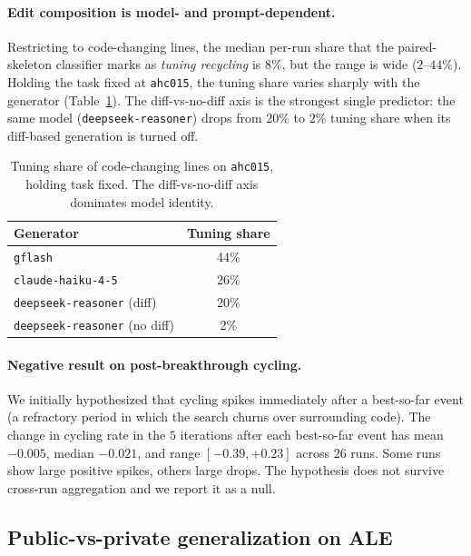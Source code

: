 \paragraph{Edit composition is model- and prompt-dependent.}
Restricting to code-changing lines, the median per-run share that the paired-skeleton classifier marks as \emph{tuning recycling} is $8\%$, but the range is wide ($2$--$44\%$). Holding the task fixed at \texttt{ahc015}, the tuning share varies sharply with the generator (Table~\ref{tab:tuning-share-ahc015}). The diff-vs-no-diff axis is the strongest single predictor: the same model (\texttt{deepseek-reasoner}) drops from $20\%$ to $2\%$ tuning share when its diff-based generation is turned off.

\begin{table}[h]
\centering
\caption{Tuning share of code-changing lines on \texttt{ahc015}, holding task fixed. The diff-vs-no-diff axis dominates model identity.}
\label{tab:tuning-share-ahc015}
\small
\setlength{\tabcolsep}{8pt}
\renewcommand{\arraystretch}{1.2}
\begin{tabular}{@{}lc@{}}
\toprule
\textbf{Generator} & \textbf{Tuning share} \\
\midrule
\texttt{gflash}                     & 44\% \\
\texttt{claude-haiku-4-5}           & 26\% \\
\texttt{deepseek-reasoner} (diff)   & 20\% \\
\texttt{deepseek-reasoner} (no diff)& \phantom{0}2\% \\
\bottomrule
\end{tabular}
\end{table}

\paragraph{Negative result on post-breakthrough cycling.}
We initially hypothesized that cycling spikes immediately after a best-so-far event (a refractory period in which the search churns over surrounding code). The change in cycling rate in the $5$ iterations after each best-so-far event has mean $-0.005$, median $-0.021$, and range $[-0.39, +0.23]$ across $26$ runs. Some runs show large positive spikes, others large drops. The hypothesis does not survive cross-run aggregation and we report it as a null.

\subsection{Public-vs-private generalization on ALE}
\label{appendix:public-private}

